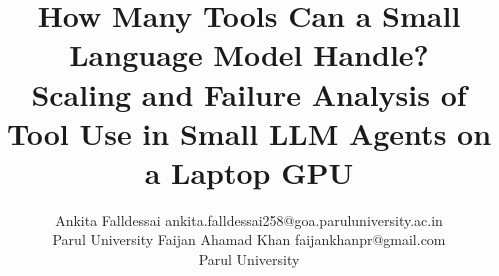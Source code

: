\documentclass[10pt]{article}
\title{How Many Tools Can a Small Language Model Handle?\\
Scaling and Failure Analysis of Tool Use in Small LLM Agents on a Laptop GPU}
\author{\name Ankita Falldessai \email ankita.falldessai258@goa.paruluniversity.ac.in \\
      \addr Parul University
      \AND
      \name Faijan Ahamad Khan \email faijankhanpr@gmail.com \\
      \addr Parul University}
\begin{document}
\maketitle

\begin{abstract}

\end{abstract}














\appendix

\end{document}

